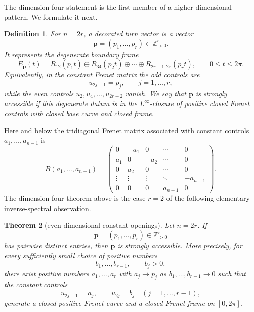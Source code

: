 \documentclass[10pt,a4paper]{amsart}
\newtheorem{theorem}{Theorem}[section]
\newtheorem{definition}[theorem]{Definition}
\begin{document}
The dimension-four statement is the first member of a higher-dimensional pattern.
We formulate it next.

\begin{definition}
For $n=2r$, a \emph{decorated turn vector} is a vector
\[
        \mathbf p=(p_1,\ldots,p_r)\in\mathbb Z_{>0}^r .
\]
It represents the degenerate boundary frame
\begin{equation}\label{eq:even-decorated-frame}
        E_{\mathbf p}(t)=R_{12}(p_1t)\oplus R_{34}(p_2t)\oplus\cdots\oplus
        R_{2r-1,2r}(p_rt),\qquad 0\le t\le2\pi .
\end{equation}
Equivalently, in the constant Frenet matrix the odd controls are
\[
        u_{2j-1}=p_j,
        \qquad j=1,\ldots,r,
\]
while the even controls $u_2,u_4,\ldots,u_{2r-2}$ vanish.  We say that $\mathbf p$
is \emph{strongly accessible} if this degenerate datum is in the $L^\infty$-closure
of positive closed Frenet controls with closed base curve and closed frame.
\end{definition}

Here and below the tridiagonal Frenet matrix associated with constant controls
$a_1,\ldots,a_{n-1}$ is
\begin{equation}\label{eq:general-tridiagonal-B}
        B(a_1,\ldots,a_{n-1})=
        \begin{pmatrix}
        0&-a_1&0&\cdots&0\\
        a_1&0&-a_2&\cdots&0\\
        0&a_2&0&\cdots&0\\
        \vdots&\vdots&\vdots&\ddots&-a_{n-1}\\
        0&0&0&a_{n-1}&0
        \end{pmatrix}.
\end{equation}
The dimension-four theorem above is the case $r=2$ of the following elementary
inverse-spectral observation.


\begin{theorem}[even-dimensional constant openings]\label{thm:even-constant-openings}
Let $n=2r$.  If
\[
        \mathbf p=(p_1,\ldots,p_r)\in\mathbb Z_{>0}^r
\]
has pairwise distinct entries, then $\mathbf p$ is strongly accessible.  More
precisely, for every sufficiently small choice of positive numbers
\[
        b_1,\ldots,b_{r-1},\qquad b_j>0,
\]
there exist positive numbers $a_1,\ldots,a_r$ with $a_j\to p_j$ as
$b_1,\ldots,b_{r-1}\to0$ such that the constant controls
\begin{equation}\label{eq:even-opening-controls}
        u_{2j-1}=a_j,
        \qquad
        u_{2j}=b_j
        \quad (j=1,\ldots,r-1),
\end{equation}
generate a closed positive Frenet curve and a closed Frenet frame on $[0,2\pi]$.
\end{theorem}
\end{document}
